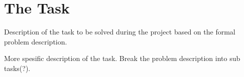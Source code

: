 \section{The Task}

Description of the task to be solved during the project based on the formal problem description.

More spesific description of the task. Break the problem description into sub tasks(?).